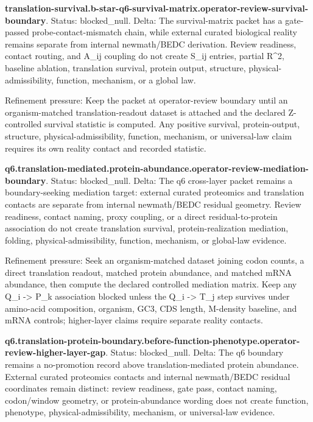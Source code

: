 \textbf{translation-survival.b-star-q6-survival-matrix.operator-review-survival-boundary}. Status: blocked\_null. Delta: The survival-matrix packet has a gate-passed probe-contact-mismatch chain, while external curated biological reality remains separate from internal newmath/BEDC derivation. Review readiness, contact routing, and A\_ij coupling do not create S\_ij entries, partial R\textasciicircum{}2, baseline ablation, translation survival, protein output, structure, physical-admissibility, function, mechanism, or a global law.

Refinement pressure: Keep the packet at operator-review boundary until an organism-matched translation-readout dataset is attached and the declared Z-controlled survival statistic is computed. Any positive survival, protein-output, structure, physical-admissibility, function, mechanism, or universal-law claim requires its own reality contact and recorded statistic.

\textbf{q6.translation-mediated.protein-abundance.operator-review-mediation-boundary}. Status: blocked\_null. Delta: The q6 cross-layer packet remains a boundary-seeking mediation target: external curated proteomics and translation contacts are separate from internal newmath/BEDC residual geometry. Review readiness, contact naming, proxy coupling, or a direct residual-to-protein association do not create translation survival, protein-realization mediation, folding, physical-admissibility, function, mechanism, or global-law evidence.

Refinement pressure: Seek an organism-matched dataset joining codon counts, a direct translation readout, matched protein abundance, and matched mRNA abundance, then compute the declared controlled mediation matrix. Keep any Q\_i -> P\_k association blocked unless the Q\_i -> T\_j step survives under amino-acid composition, organism, GC3, CDS length, M-density baseline, and mRNA controls; higher-layer claims require separate reality contacts.

\textbf{q6.translation-protein-boundary.before-function-phenotype.operator-review-higher-layer-gap}. Status: blocked\_null. Delta: The q6 boundary remains a no-promotion record above translation-mediated protein abundance. External curated proteomics contacts and internal newmath/BEDC residual coordinates remain distinct: review readiness, gate pass, contact naming, codon/window geometry, or protein-abundance wording does not create function, phenotype, physical-admissibility, mechanism, or universal-law evidence.

